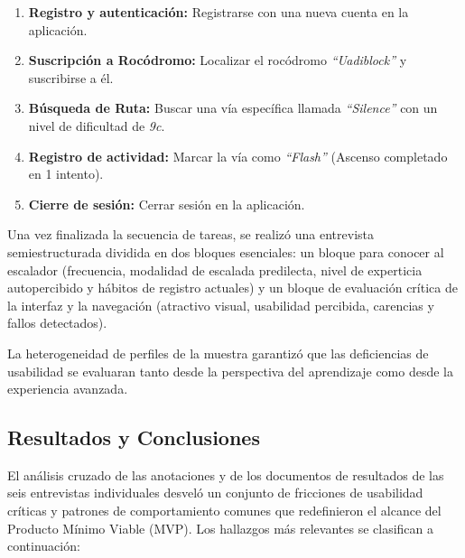 \begin{enumerate}
    \item \textbf{Registro y autenticación:} Registrarse con una nueva cuenta en la aplicación.
    \item \textbf{Suscripción a Rocódromo:} Localizar el rocódromo \textit{``Uadiblock''} y suscribirse a él.
    \item \textbf{Búsqueda de Ruta:} Buscar una vía específica llamada \textit{``Silence''} con un nivel de dificultad de \textit{9c}.
    \item \textbf{Registro de actividad:} Marcar la vía como \textit{``Flash''} (Ascenso completado en 1 intento).
    \item \textbf{Cierre de sesión:} Cerrar sesión en la aplicación.
\end{enumerate}

Una vez finalizada la secuencia de tareas, se realizó una entrevista semiestructurada dividida en dos bloques esenciales: un bloque para conocer al escalador (frecuencia, modalidad de escalada predilecta, nivel de experticia autopercibido y hábitos de registro actuales) y un bloque de evaluación crítica de la interfaz y la navegación (atractivo visual, usabilidad percibida, carencias y fallos detectados). 

La heterogeneidad de perfiles de la muestra garantizó que las deficiencias de usabilidad se evaluaran tanto desde la perspectiva del aprendizaje como desde la experiencia avanzada.

\subsection{Resultados y Conclusiones}

El análisis cruzado de las anotaciones y de los documentos de resultados de las seis entrevistas individuales desveló un conjunto de fricciones de usabilidad críticas y patrones de comportamiento comunes que redefinieron el alcance del Producto Mínimo Viable (MVP). Los hallazgos más relevantes se clasifican a continuación:

